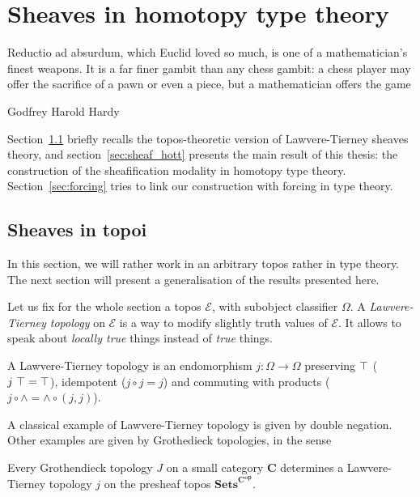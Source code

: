 \chapter{Sheaves in homotopy type theory}
\label{chap:sheaf}
\epigraph{Reductio ad absurdum, which Euclid loved so much, is one of
  a mathematician's finest weapons. It is a far finer gambit than any
  chess gambit: a chess player may offer the sacrifice of a pawn or
  even a piece, but a mathematician offers the game}{Godfrey Harold Hardy}

Section~\ref{sec:sheaf_topos} briefly recalls the topos-theoretic
version of Lawvere-Tierney sheaves theory, and
section~\ref{sec:sheaf_hott} presents the main result of this thesis:
the construction of the sheafification modality in homotopy type
theory. Section~\ref{sec:forcing} tries to link our construction
with forcing in type theory.

\section{Sheaves in topoi}
\label{sec:sheaf_topos}

In this section, we will rather work in an arbitrary topos rather in type theory. The next section will present a
generalisation of the results presented here.

Let us fix for the whole section a topos $\mathcal E$, with subobject
classifier $\Omega$. A {\em Lawvere-Tierney topology} on $\mathcal E$
is a way to modify slightly truth values of $\mathcal E$. It allows to
speak about {\em locally true} things instead of {\em true} things.

\begin{defi}\label{defi:LT}
  A Lawvere-Tierney topology is an endomorphism $j:\Omega \to \Omega$
  preserving $\top$ ($j \ \top = \top$), idempotent ($j\circ j =
  j$) and commuting with products ($j \circ \wedge = \wedge \circ (j,j)$).
\end{defi}

A classical example of Lawvere-Tierney topology is given by double
negation. Other examples are given by Grothedieck topologies, in the
sense
\begin{thm}
  Every Grothendieck topology $J$ on a small category $\mathbf C$ determines a
  Lawvere-Tierney topology $j$ on the presheaf topos
  $\mathbf{Sets}^{\mathbf C^{\mathbf{op}}}$.
\end{thm}

